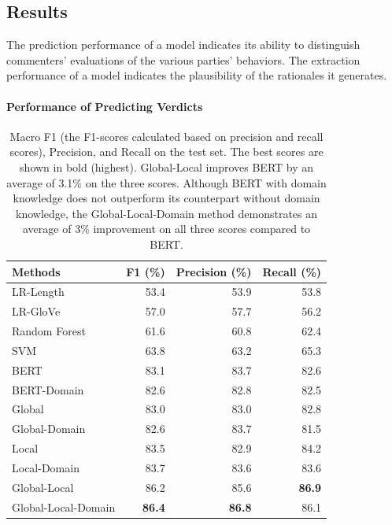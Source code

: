 \documentclass[letterpaper]{article} %
\begin{document}
\subsection{Results}

The prediction performance of a model indicates its ability to distinguish commenters' evaluations of the various parties' behaviors.
The extraction performance of a model indicates the plausibility of the rationales it generates.

\paragraph{Performance of Predicting Verdicts}

\begin{table}[!htb]
\centering
\small
\begin{tabular}{l r r r}
\toprule
{Methods}& F1 (\%)& Precision (\%)& Recall (\%)\\
\midrule
    {LR-Length}&53.4&53.9&53.8\\
    {LR-GloVe}&57.0&57.7&56.2\\
    {Random Forest}&61.6&60.8&62.4\\
    {SVM}&63.8&63.2&65.3\\
    \midrule
    {BERT}&83.1&83.7&82.6\\ 
    {BERT-{Domain}}&82.6&82.8&82.5\\
    \midrule
    Global&83.0&83.0&82.8\\
    {{Global}-{Domain}}&82.6&83.7&81.5\\ 
    \midrule
    Local&83.5&82.9&84.2\\
    {{Local}-{Domain}}&83.7&83.6&83.6\\
    \midrule
    Global-Local&86.2&85.6&\textbf{86.9}\\
    {{Global}-{Local}-{Domain}}&\textbf{86.4}&\textbf{86.8}&86.1\\ 
    \bottomrule
    \end{tabular}
\caption{Macro F1 (the F1-scores calculated based on precision and recall scores), Precision, and Recall on the test set. The best scores are shown in bold (highest). Global-Local improves BERT by an average of 3.1\% on the three scores. Although BERT with domain knowledge does not outperform its counterpart without domain knowledge, the Global-Local-Domain method demonstrates an average of 3\% improvement on all three scores compared to BERT.}
\label{tab:predict_results}
\end{table}
\end{document}
